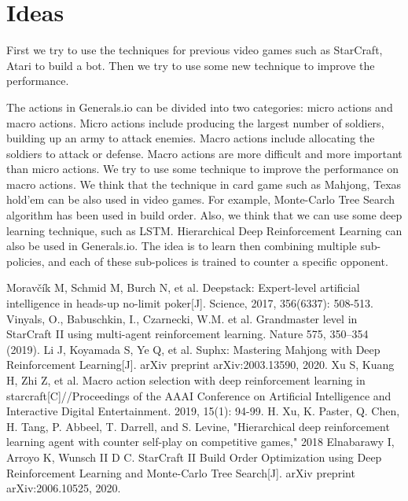\documentclass{elegantpaper}
\begin{document}
\section{Ideas}
First we try to use the techniques for previous video games such as StarCraft, Atari to build a bot. Then we try to use some new technique to improve the performance.

The actions in Generals.io can be divided into two categories: micro actions and macro actions. Micro actions include producing the largest number of soldiers, building up an army to attack enemies. Macro actions include allocating the soldiers to attack or defense. Macro actions are more difficult and more important than micro actions. We try to use some technique to improve the performance on macro actions. We think that the technique in card game such as Mahjong, Texas hold'em can be also used in video games. For example, Monte-Carlo Tree Search algorithm has been used in build order\cite{El20}. Also, we think that we can use some deep learning technique, such as LSTM\cite{bili19}. Hierarchical Deep Reinforcement Learning can also be used in Generals.io\cite{Xu19}. The idea is to learn then combining multiple sub-policies, and each of these sub-polices is trained to counter a specific opponent.

\begin{thebibliography}{99}
 Moravčík M, Schmid M, Burch N, et al. Deepstack: Expert-level artificial intelligence in heads-up no-limit poker[J]. Science, 2017, 356(6337): 508-513.
Vinyals, O., Babuschkin, I., Czarnecki, W.M. et al. Grandmaster level in StarCraft II using multi-agent reinforcement learning. Nature 575, 350–354 (2019).
Li J, Koyamada S, Ye Q, et al. Suphx: Mastering Mahjong with Deep Reinforcement Learning[J]. arXiv preprint arXiv:2003.13590, 2020.
Xu S, Kuang H, Zhi Z, et al. Macro action selection with deep reinforcement learning in starcraft[C]//Proceedings of the AAAI Conference on Artificial Intelligence and Interactive Digital Entertainment. 2019, 15(1): 94-99.
H. Xu, K. Paster, Q. Chen, H. Tang, P. Abbeel, T. Darrell, and S. Levine,
"Hierarchical deep reinforcement learning agent with counter self-play
on competitive games," 2018
Elnabarawy I, Arroyo K, Wunsch II D C. StarCraft II Build Order Optimization using Deep Reinforcement Learning and Monte-Carlo Tree Search[J]. arXiv preprint arXiv:2006.10525, 2020.
\end{thebibliography}
\end{document}
